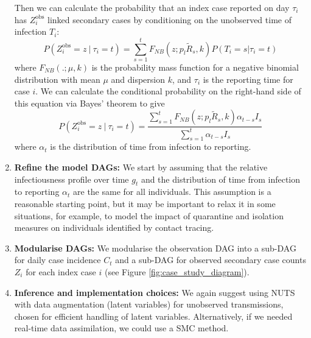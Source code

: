 \documentclass{article}
\begin{document}
\begin{enumerate}
   Then we can calculate the probability that an index case reported on day $\tau_i$ has $Z^\mathrm{obs}_i$ linked secondary cases by conditioning on the unobserved time of infection $T_i$:
   \begin{equation}
       P(Z^\mathrm{obs}_i=z \ | \ \tau_i=t) = \sum_{s=1}^{t} F_{NB}(z; p_l\tilde{R}_s,k) P(T_i=s | \tau_i=t)
   \end{equation}
where $F_{NB}(.;\mu,k)$ is the probability mass function for a negative binomial distribution with mean $\mu$ and dispersion $k$, and $\tau_i$ is the reporting time for case $i$.  We can calculate the conditional probability on the right-hand side of this equation via Bayes' theorem to give
   \begin{equation} \label{eq:Zobs}
       P(Z^\mathrm{obs}_i=z \ | \ \tau_i=t) = \frac{\sum_{s=1}^{t} F_{NB}(z; p_l\tilde{R}_s,k) \alpha_{t-s} I_s}{\sum_{s=1}^{t}\alpha_{t-s} I_s}  
   \end{equation}
 where $\alpha_t$ is the distribution of time from infection to reporting.

    \item \textbf{Refine the model DAGs:}  We start by assuming that the relative infectiousness profile over time $g_t$ and the distribution of time from infection to reporting $\alpha_t$ are the same for all individuals. This assumption is a reasonable starting point, but it may be important to relax it in some situations, for example, to model the impact of quarantine and isolation measures on individuals identified by contact tracing.

    \item \textbf{Modularise DAGs:} We modularise the observation \ac{DAG} into a sub-DAG for daily case incidence $C_t$ and a sub-DAG for observed secondary case counts $Z_i$ for each index case $i$ (see Figure \ref{fig:case_study_diagram}).  
    
    \item \textbf{Inference and implementation choices:} We again suggest using \ac{NUTS} with data augmentation (latent variables) for unobserved transmissions, chosen for efficient handling of latent variables. Alternatively, if we needed real-time  data assimilation, we could use a \ac{SMC} method.


\end{enumerate}
\end{document}
